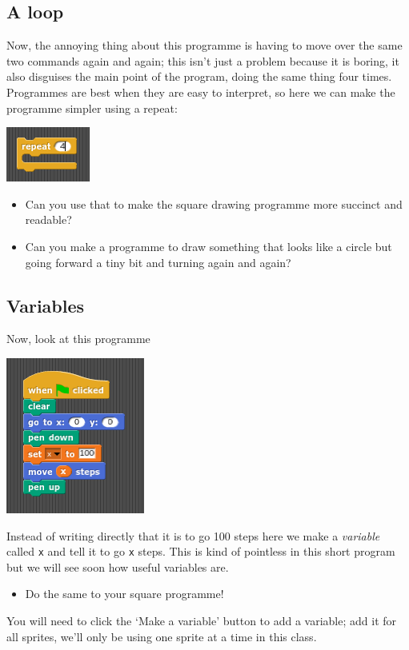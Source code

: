 \documentclass[11pt,a4paper]{scrartcl}
\begin{document}
\subsection*{A loop}

Now, the annoying thing about this programme is having to move over
the same two commands again and again; this isn't just a problem
because it is boring, it also disguises the main point of the program,
doing the same thing four times. Programmes are best when they are
easy to interpret, so here we can make the programme simpler using a
repeat:
\begin{center}
\includegraphics{repeat.png}
\end{center}
\begin{itemize}
\item Can you use that to make the square drawing programme more succinct and readable? 
\item Can you make a programme to draw something that looks like a circle but going forward a tiny bit and turning again and again?
\end{itemize}

\subsection*{Variables}

Now, look at this programme
\begin{center}
\includegraphics{variable.png}
\end{center}
Instead of writing directly that it is to go 100 steps here we make a
\textsl{variable} called \texttt{x} and tell it to go \texttt{x}
steps. This is kind of pointless in this short program but we will see
soon how useful variables are. 
\begin{itemize}
\item Do the same to your square programme!
\end{itemize}
You will need to click the \lq{}Make a variable\rq{} button to add a
variable; add it for all sprites, we'll only be using one sprite at a
time in this class.
\end{document}
